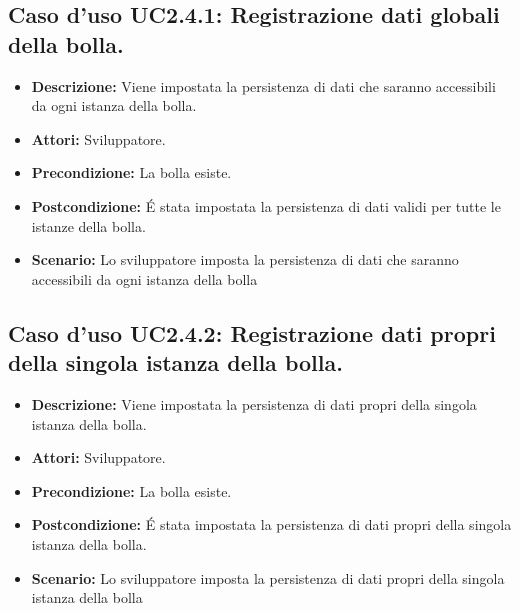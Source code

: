 \subsection{Caso d'uso UC2.4.1: Registrazione dati globali della bolla.}
\begin{itemize}
\item[]\textbf{Descrizione:} Viene impostata la persistenza di dati che saranno accessibili da ogni istanza della bolla.
\item[]\textbf{Attori:} Sviluppatore. 
\item[]\textbf{Precondizione:} La bolla esiste. 
\item[]\textbf{Postcondizione:} \'E stata impostata la persistenza di dati validi per tutte le istanze della bolla. 
\item[]\textbf{Scenario:}
Lo sviluppatore imposta la  persistenza di dati che saranno accessibili da ogni istanza della bolla 
\end{itemize}

\subsection{Caso d'uso UC2.4.2: Registrazione dati propri della singola istanza della bolla.}
\begin{itemize}
\item[]\textbf{Descrizione:} Viene impostata la persistenza di dati propri della singola istanza della bolla.
\item[]\textbf{Attori:} Sviluppatore. 
\item[]\textbf{Precondizione:} La bolla esiste. 
\item[]\textbf{Postcondizione:} \'E stata impostata la persistenza di dati propri della singola istanza della bolla. 
\item[]\textbf{Scenario:}
Lo sviluppatore imposta la persistenza di dati propri della singola istanza della bolla 
\end{itemize}

\clearpage

